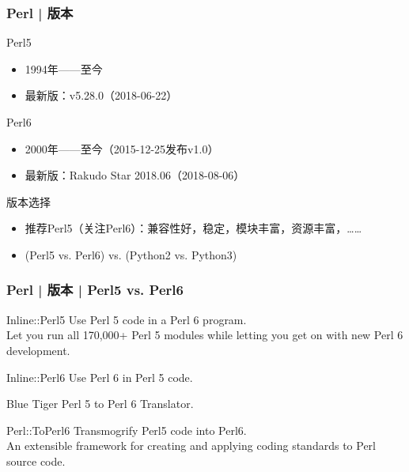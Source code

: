 \begin{frame}
  \frametitle{Perl | 版本}
  \begin{block}{Perl5}
    \begin{itemize}
      \item 1994年——至今
      \item 最新版：v5.28.0（2018-06-22）
    \end{itemize}
  \end{block}
  \pause
  \begin{block}{Perl6}
    \begin{itemize}
      \item 2000年——至今（2015-12-25发布v1.0）
      \item 最新版：Rakudo Star 2018.06（2018-08-06）
    \end{itemize}
  \end{block}
  \pause
  \begin{block}{版本选择}
    \begin{itemize}
      \item 推荐Perl5（关注Perl6）：兼容性好，稳定，模块丰富，资源丰富，……
      \item (Perl5 vs. Perl6) vs. (Python2 vs. Python3)
    \end{itemize}
  \end{block}
\end{frame}

\begin{frame}[fragile]
  \frametitle{Perl | 版本 | Perl5 vs. Perl6}
  \begin{block}{Inline::Perl5}
    Use Perl 5 code in a Perl 6 program.\\
    Let you run all 170,000+ Perl 5 modules while letting you get on with new Perl 6 development.
  \end{block}
  \pause
  \begin{block}{Inline::Perl6}
    Use Perl 6 in Perl 5 code.
  \end{block}
  \pause
  \begin{block}{Blue Tiger}
    Perl 5 to Perl 6 Translator.
  \end{block}
  \pause
  \begin{block}{Perl::ToPerl6}
    Transmogrify Perl5 code into Perl6.\\
    An extensible framework for creating and applying coding standards to Perl source code.
  \end{block}
\end{frame}

